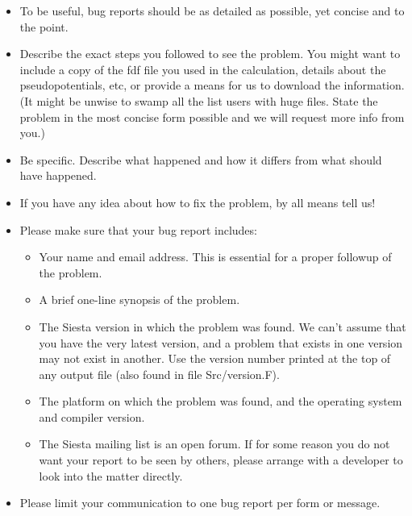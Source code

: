 \documentclass[11pt]{article}
\begin{document}
\begin{itemize}

\item To be useful, bug reports should be as detailed as possible, yet
concise and to the point.

\item Describe the exact steps you followed to see the problem. You
might want to include a copy of the fdf file you used in the
calculation, details about the pseudopotentials, etc, or provide a
means for us to download the information. (It might be unwise to swamp
all the list users with huge files. State the problem in the most
concise form possible and we will request more info from you.)

\item Be specific. Describe what happened and how it differs from what
should have happened.

\item If you have any idea about how to fix the problem, by all means
tell us!

\item Please make sure that your bug report includes:

\begin{itemize}

\item Your name and email address.  This is essential for a proper
followup of the problem.

\item A brief one-line synopsis of the problem.

\item The {\sc Siesta} version in which the problem was found. We can't
assume that you have the very latest version, and a problem that exists in
one version may not exist in another. Use the version number printed
at the top of any output file (also found in file Src/version.F).

\item The platform on which the problem was found, and the operating
system and compiler version.

\item The {\sc Siesta} mailing list is an open forum.
If for some reason you do not want your report
to be seen by others, please arrange with a developer to look into the
matter directly.

\end{itemize}

\item Please limit your communication to one bug report per form or message.

\end{itemize}
\end{document}
